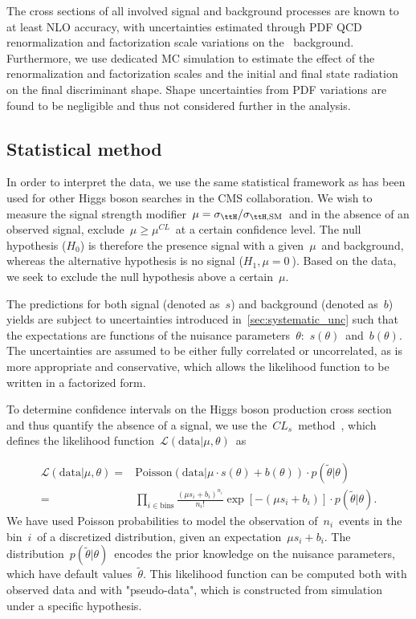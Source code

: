 The cross sections of all involved signal and background processes are known to at least NLO accuracy, with uncertainties estimated through PDF QCD renormalization and factorization scale variations on the \ttbar~background. Furthermore, we use dedicated MC simulation to estimate the effect of the renormalization and factorization scales and the initial and final state radiation on the final discriminant shape. Shape uncertainties from PDF variations are found to be negligible and thus not considered further in the analysis.

\subsection{Statistical method}
\label{sec:statistical_method}
In order to interpret the data, we use the same statistical framework as has been used for other Higgs boson searches in the CMS collaboration\cite{Chatrchyan:2012xdj,Chatrchyan:2012tx,ATLAS:2011tau}. We wish to measure the signal strength modifier~$\mu = \sigma_{\ttH}/\sigma_{\ttH,\mathrm{SM}}$~and in the absence of an observed signal, exclude~$\mu \ge \mu^{CL}$~at a certain confidence level. The null hypothesis ($H_0$) is therefore the presence signal with a given~$\mu$~and background, whereas the alternative hypothesis is no signal ($H_1, \mu = 0~$). Based on the data, we seek to exclude the null hypothesis above a certain~$\mu$.

The predictions for both signal (denoted as~$s$) and background (denoted as~$b$) yields are subject to uncertainties introduced in~\cref{sec:systematic_unc} such that the expectations are functions of the nuisance parameters~$\theta$:~$s(\theta)$~and~$b(\theta)$. The uncertainties are assumed to be either fully correlated or uncorrelated, as is more appropriate and conservative, which allows the likelihood function to be written in a factorized form.

To determine confidence intervals on the Higgs boson production cross section and thus quantify the absence of a signal, we use the~$CL_s$~method~\cite{Junk:1999kv,Read:2002}, which defines the likelihood function~$\mathcal{L}(\mathrm{data} | \mu, \theta)$~as

\begin{align}
\label{eq:likelihood}
\mathcal{L}(\mathrm{data} | \mu, \theta) =&  \mathrm{Poisson}(\mathrm{data} | \mu \cdot s(\theta) + b(\theta)) \cdot p(\tilde{\theta} | \theta)\\
=& \prod_{i\in \mathrm{bins}} \frac{(\mu s_i + b_i)^{n_i}}{n_i!} \exp{[-(\mu s_i + b_i)]} \cdot p(\tilde{\theta} | \theta).
\end{align}
We have used Poisson probabilities to model the observation of~$n_i$~events in the bin~$i$~of a discretized distribution, given an expectation~$\mu s_i + b_i$. The distribution~$p(\tilde{\theta} | \theta)$~encodes the prior knowledge on the nuisance parameters, which have default values~$\tilde{\theta}$. This likelihood function can be computed both with observed data and with "pseudo-data", which is constructed from simulation under a specific hypothesis.


